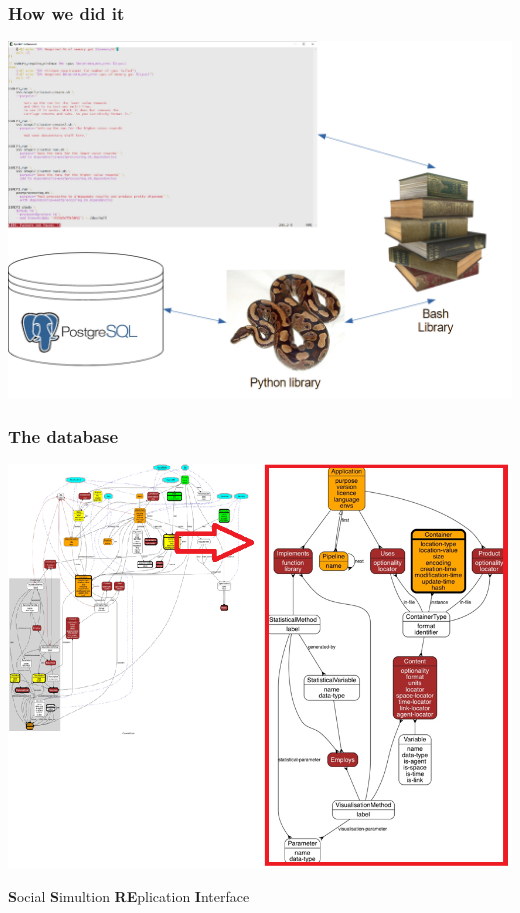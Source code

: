 \documentclass[usenames,dvipsnames,10pt]{beamer}
\begin{document}
\begin{frame}
    \frametitle{How we did it}
    \includegraphics[width=\columnwidth]{img/how.png}
\end{frame}

\begin{frame}
    \center
    \frametitle{The database}

    \includegraphics[width=.75\textwidth]{img/schema.png} 

    \large
    \textbf{S}ocial \textbf{S}imultion \textbf{RE}plication \textbf{I}nterface
\end{frame}
\end{document}

